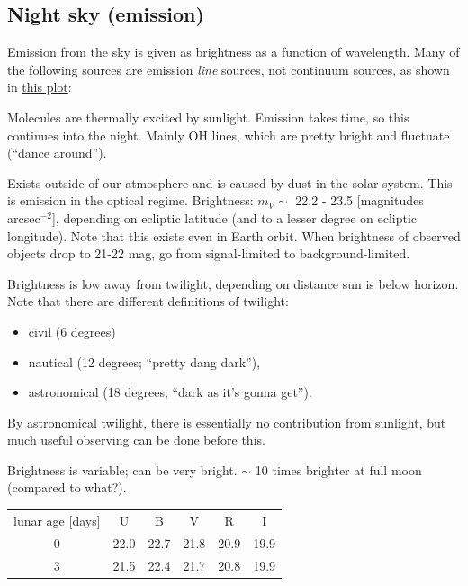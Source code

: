 \documentclass[12pt]{article}
\begin{document}
\subsection{Night sky (emission)}
Emission from the sky is given as brightness as a function of wavelength.
Many of the following sources are emission \emph{line} sources, not continuum
sources, as shown in \href{http://astronomy.nmsu.edu/holtz/a535/html/diagrams/a535/skyemiss.htm}
{this plot}:
\begin{description}[style=nextline]
    \item [air glow] Molecules are thermally excited by sunlight.
        Emission takes time, so this continues into the night.
        Mainly OH lines, which are pretty bright and fluctuate (``dance around'').
    \item [zodiacal light]
        Exists outside of our atmosphere and is caused by dust in the solar
        system. This is emission in the optical regime. Brightness: $m_{V}
        \sim$ 22.2 - 23.5 [magnitudes arcsec$^{-2}$], depending on ecliptic
        latitude (and to a lesser degree on ecliptic longitude). Note that this
        exists even in Earth orbit. When brightness of observed objects drop to
        21-22 mag, go from signal-limited to background-limited.
    \item [sunlight] Brightness is low away from twilight, depending on
        distance sun is below horizon. Note that there are different definitions of
        twilight:
        \begin{itemize}
            \item civil (6 degrees)
            \item nautical (12 degrees; ``pretty dang dark''),
            \item astronomical (18 degrees; ``dark as it's gonna get'').
        \end{itemize}
        By astronomical twilight, there is essentially no contribution
        from sunlight, but much useful observing can be done before this.
    \item [moonlight] Brightness is variable; can be very bright.
        $\sim$ 10 times brighter at full moon (compared to what?).
        \begin{center}
            \begin{tabular}{c c c c c c}
                lunar age [days] & U & B & V & R & I\\
                0 & 22.0 & 22.7 & 21.8 & 20.9 & 19.9\\
                3 & 21.5 & 22.4 & 21.7 & 20.8 & 19.9\\

\end{tabular}
\end{center}
\end{description}
\end{document}
